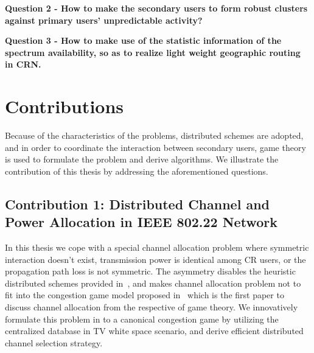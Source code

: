 \textbf{Question 2 - How to make the secondary users to form robust clusters against primary users' unpredictable activity?}

\textbf{Question 3 - How to make use of the statistic information of the spectrum availability, so as to realize light weight geographic routing in CRN.}




\section{Contributions}
Because of the characteristics of the problems, distributed schemes are adopted, and in order to coordinate the interaction between secondary users, game theory is used to formulate the problem and derive algorithms.
We illustrate the contribution of this thesis by addressing the aforementioned questions.


\subsection*{Contribution 1: Distributed Channel and Power Allocation in IEEE 802.22 Network}



In this thesis we cope with a special channel allocation problem where symmetric interaction doesn't exist, \ie transmission power is identical among CR users, or the propagation path loss is not symmetric. 
The asymmetry disables the heuristic distributed schemes provided in~\cite{Ko_DistributedCA}, and makes channel allocation problem not to fit into the congestion game model proposed in~\cite{allerton08_liu} which is the first paper to discuss channel allocation from the respective of game theory.
We innovatively formulate this problem in to a canonical congestion game by utilizing the centralized database in TV white space scenario, and derive efficient distributed channel selection strategy.


